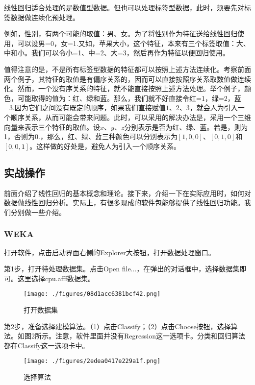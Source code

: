 线性回归适合处理的是数值型数据。但也可以处理标签型数据，此时，须要先对标签数据做连续化预处理。

例如，性别，有两个可能的取值：男、女。为了将性别作为特征送给线性回归使用，可以设男=0，女=1.又如，苹果大小，这个特征，本来有三个标签取值：大、中和小。我们可以令小=1、中=2、大=3，然后再作为特征以便回归使用。

值得注意的是，不是所有标签型数据的特征都可以按照上述方法连续化。考察前面两个例子，其特征的取值是有偏序关系的，因而可以直接按照序关系取数值做连续化。然而，一个没有序关系的特征，就不能直接按照上述方法处理。举个例子，颜色，可能取得的值为：红、绿和蓝。那么，我们就不好直接令红=1，绿=2，蓝=3.因为它们之间没有既定的顺序，如果我们直接赋值$1$、$2$、$3$，就会人为引入一个顺序关系，从而可能会带来问题。此时，可以采用的解决办法是，采用一个三维向量来表示三个特征的取值。设$x$、$y$、$z$分别表示是否为红、绿、蓝。若是，则为1，否则为0.，那么，红、绿、蓝三种颜色可以分别表示为$[1,0,0]$、$[0,1,0]$和$[0,0,1]$。这样做的好处是，避免人为引入一个顺序关系。

\subsection{实战操作}

前面介绍了线性回归的基本概念和理论。接下来，介绍一下在实际应用时，如何对数据做线性回归分析。实际上，有很多现成的软件包能够提供了线性回归功能。我们分别做一些介绍。

\subsubsection{WEKA}


打开软件，点击启动界面右侧的Explorer大按钮，打开数据处理窗口。

第1步，打开待处理数据集。点击Open file...，在弹出的对话框中，选择数据集即可。这里选择cpu.afff数据集。
\begin{figure}[ht]
\centering
\texttt{[image: ./figures/08d1acc6381bcf42.png]}
\caption{打开数据集} \label{fig_LiGr_5}
\end{figure}

第2步，准备选择建模算法。（1）点击Classify；（2）点击Choose按钮，选择算法。如图2所示。注意，软件里面并没有Regression这一选项卡。分类和回归算法都在Classify这一选项卡中。
\begin{figure}[ht]
\centering
\texttt{[image: ./figures/2edea0417e229a1f.png]}
\caption{选择算法} \label{fig_LiGr_2}
\end{figure}

